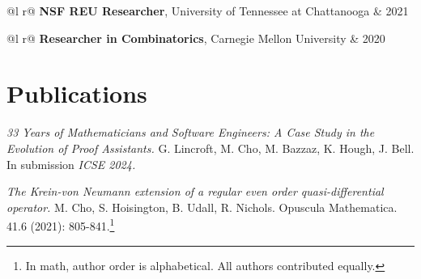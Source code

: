 \documentclass[12pt]{article}
\begin{document}
\begin{tabularx}{\linewidth}{ @{}l r@{} }
\textbf{NSF REU Researcher}, University of Tennessee at Chattanooga & \hfill 2021 \\[3pt]
\end{tabularx}

\begin{tabularx}{\linewidth}{ @{}l r@{} }
\textbf{Researcher in Combinatorics}, Carnegie Mellon University & \hfill 2020 \\[3pt]
\end{tabularx}

\section{Publications}

\textit{33 Years of Mathematicians and Software Engineers: A Case Study in the Evolution of Proof Assistants.} \newline
G. Lincroft, M. Cho, M. Bazzaz, K. Hough, J. Bell. In submission \textit{ICSE 2024.}

\textit{The Krein-von Neumann extension of a regular even order quasi-differential operator.} 
M. Cho, S. Hoisington, B. Udall, R. Nichols. Opuscula Mathematica. 41.6 (2021): 805-841.\footnote{In math, author order is alphabetical. All authors contributed equally.}
\end{document}
